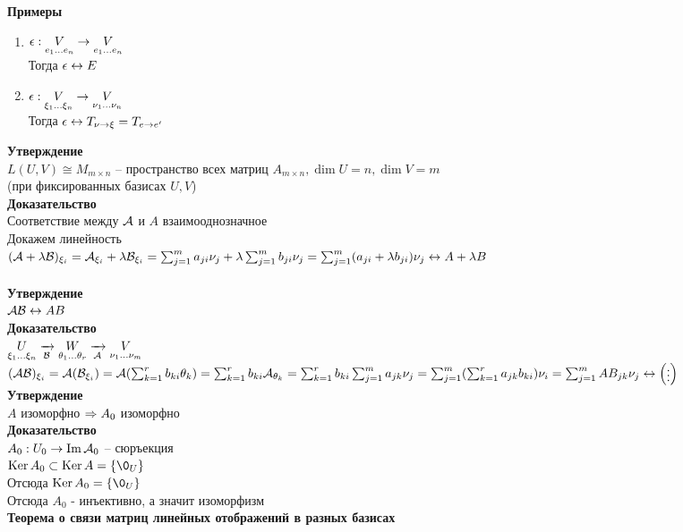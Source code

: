 \documentclass[12pt]{article}
\begin{document}
\textbf{Примеры}
\begin{enumerate}
    \item $\epsilon: \underset{e_1\ldots e_n}V \rightarrow \underset{e_1 \ldots e_n}V$\\
    Тогда $\epsilon \leftrightarrow E$
    \item $\epsilon: \underset{\xi_1\ldots \xi_n}V \rightarrow \underset{\nu_1 \ldots \nu_n}V$\\
    Тогда $\epsilon \leftrightarrow T_{\nu \rightarrow \xi} = T_{e\rightarrow e'}$
\end{enumerate}
\textbf{Утверждение}\\
$L(U, V) \cong M_{m\times n}$ -- пространство всех матриц $A_{m\times n}, \dim U = n, \dim V = m$\\
(при фиксированных базисах $U, V$)\\
\textbf{Доказательство}\\
Соответствие между $\mathcal{A}$ и $A$ взаимооднозначное\\
Докажем линейность\\
$(\mathcal{A}+\lambda \mathcal{B})_{\xi_i} = \mathcal{A}_{\xi_i}+\lambda\mathcal{B}_{\xi_i} = \sum_{j=1}^m a_{ji}\nu_j + \lambda \sum_{j=1}^m b_{ji}\nu_j = \sum_{j=1}^m(a_{ji} + \lambda b_{ji})\nu_j \leftrightarrow A+\lambda B$\\\\
\textbf{Утверждение}\\
$\mathcal{A}\mathcal{B} \leftrightarrow AB$\\
\textbf{Доказательство}\\
$\underset{\xi_1\ldots\xi_n}{U}\xrightarrow[\mathcal{B}]{} \underset{\theta_1\ldots\theta_r}{W} \xrightarrow[\mathcal{A}]{} \underset{\nu_1\ldots\nu_m}{V}$
$(\mathcal{A}\mathcal{B})_{\xi_i} = \mathcal{A}(\mathcal{B}_{\xi_i}) = \mathcal{A}(\sum_{k=1}^r b_{ki}\theta_k) = \sum_{k=1}^r b_{ki}\mathcal{A}_{\theta_k} = \sum_{k=1}^rb_{ki}\sum_{j=1}^m a_{jk}\nu_j = \sum_{j=1}^m(\sum_{k=1}^r a_{jk}b_{ki})\nu_i = \sum_{j=1}^m AB_{jk} \nu_j \leftrightarrow \begin{pmatrix}
    \vdots
\end{pmatrix}$\\
\textbf{Утверждение}\\
$A$ изоморфно $\Rightarrow A_0$ изоморфно\\
\textbf{Доказательство}\\
$A_0: U_0 \rightarrow \operatorname{Im} \mathcal{A}_0$ -- сюръекция\\
$\ker A_0 \subset \ker A = \{\0_U\}$\\
Отсюда $\ker A_0 = \{\0_U\}$\\
Отсюда $A_0$ - инъективно, а значит изоморфизм\\
\textbf{Теорема о связи матриц линейных отображений в разных базисах}\\
\end{document}
